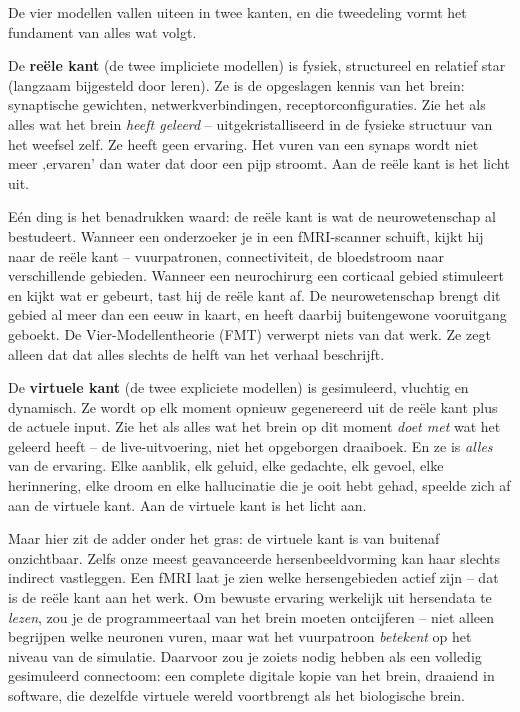 \documentclass[11pt, twoside, openright]{book}
\begin{document}
De vier modellen vallen uiteen in twee kanten, en die tweedeling vormt het fundament van alles wat volgt.

De \textbf{reële kant} (de twee impliciete modellen) is fysiek, structureel en relatief star (langzaam bijgesteld door leren). Ze is de opgeslagen kennis van het brein: synaptische gewichten, netwerkverbindingen, receptorconfiguraties. Zie het als alles wat het brein \textit{heeft geleerd} -- uitgekristalliseerd in de fysieke structuur van het weefsel zelf. Ze heeft geen ervaring. Het vuren van een synaps wordt niet meer ‚ervaren' dan water dat door een pijp stroomt. Aan de reële kant is het licht uit.

Eén ding is het benadrukken waard: de reële kant is wat de neurowetenschap al bestudeert. Wanneer een onderzoeker je in een fMRI-scanner schuift, kijkt hij naar de reële kant -- vuurpatronen, connectiviteit, de bloedstroom naar verschillende gebieden. Wanneer een neurochirurg een corticaal gebied stimuleert en kijkt wat er gebeurt, tast hij de reële kant af. De neurowetenschap brengt dit gebied al meer dan een eeuw in kaart, en heeft daarbij buitengewone vooruitgang geboekt. De Vier-Modellentheorie (FMT) verwerpt niets van dat werk. Ze zegt alleen dat dat alles slechts de helft van het verhaal beschrijft.

De \textbf{virtuele kant} (de twee expliciete modellen) is gesimuleerd, vluchtig en dynamisch. Ze wordt op elk moment opnieuw gegenereerd uit de reële kant plus de actuele input. Zie het als alles wat het brein op dit moment \textit{doet met} wat het geleerd heeft -- de live-uitvoering, niet het opgeborgen draaiboek. En ze is \textit{alles} van de ervaring. Elke aanblik, elk geluid, elke gedachte, elk gevoel, elke herinnering, elke droom en elke hallucinatie die je ooit hebt gehad, speelde zich af aan de virtuele kant. Aan de virtuele kant is het licht aan.

Maar hier zit de adder onder het gras: de virtuele kant is van buitenaf onzichtbaar. Zelfs onze meest geavanceerde hersenbeeldvorming kan haar slechts indirect vastleggen. Een fMRI laat je zien welke hersengebieden actief zijn -- dat is de reële kant aan het werk. Om bewuste ervaring werkelijk uit hersendata te \textit{lezen}, zou je de programmeertaal van het brein moeten ontcijferen -- niet alleen begrijpen welke neuronen vuren, maar wat het vuurpatroon \textit{betekent} op het niveau van de simulatie. Daarvoor zou je zoiets nodig hebben als een volledig gesimuleerd connectoom: een complete digitale kopie van het brein, draaiend in software, die dezelfde virtuele wereld voortbrengt als het biologische brein.
\end{document}
